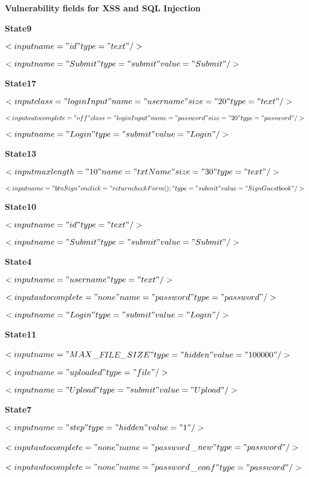 \newline
\textbf{Vulnerability fields for XSS and SQL Injection}

\newline
\textbf{State9}

$<input name="id" type="text"/>$

$<input name="Submit" type="submit" value="Submit"/>$

\newline
\textbf{State17}

 $<input class="loginInput" name="username" size="20" type="text"/>$

 $<input autocomplete="off" class="loginInput" name="password" size="20" type="password"/>$

 $<input name="Login" type="submit" value="Login"/>$

\newline
\textbf{State13}

$<input maxlength="10" name="txtName" size="30" type="text"/>$

$<input name="btnSign" onclick="return checkForm();" type="submit" value="Sign Guestbook"/>$


\newline
\textbf{State10}

$<input name="id" type="text"/>$

$<input name="Submit" type="submit" value="Submit"/>$

\newline
\textbf{State4}

$<input name="username" type="text"/>$

$<input autocomplete="none" name="password" type="password"/>$

$<input name="Login" type="submit" value="Login"/>$

\newline
\textbf{State11}

$<input name="MAX$\_$FILE$\_$SIZE" type="hidden" value="100000"/>$

$<input name="uploaded" type="file"/>$

$<input name="Upload" type="submit" value="Upload"/>$


\newline
\textbf{State7}

$<input name="step" type="hidden" value="1"/>$

$<input autocomplete="none" name="password$\_$new" type="password"/>$

 $<input autocomplete="none" name="password$\_$conf" type="password"/>$

